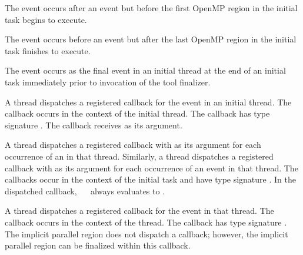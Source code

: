 The  event occurs after an  event
but before the first OpenMP region in the initial task begins to execute.

The  event occurs before an  event
but after the last OpenMP region in the initial task finishes to execute.

The  event occurs as the final event in an initial thread 
at the end of an initial task immediately prior to invocation of the tool finalizer.

\tools

A thread dispatches a registered 
callback for the  event in an initial thread.
The callback occurs in the context of the initial thread.
The callback has type signature .
The callback receives  as its  argument.

A thread dispatches a registered 
callback with  as its  argument
for each occurrence of an  in that thread.
Similarly, a thread dispatches a registered 
callback with  as its  argument
for each occurrence of an  event in that thread.
The callbacks occur in the context of the initial task and have type 
signature . In the dispatched
callback, \code{(}~\code{&}~ always evaluates to
.

A thread dispatches a registered 
callback for the  event in that thread.
The callback occurs in the context of the thread.  The callback has type signature
. The implicit parallel region does not dispatch 
a  callback; however, the implicit parallel region 
can be finalized within this  callback.

